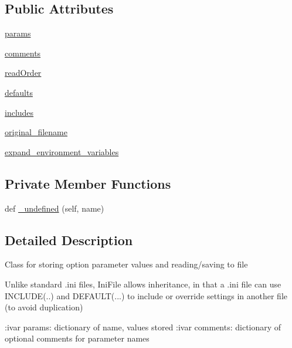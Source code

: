 \subsection*{Public Attributes}
\begin{DoxyCompactItemize}
\item 
\mbox{\hyperlink{classgetdist_1_1inifile_1_1IniFile_ade5c24106562f55d45b3489dfca2b895}{params}}
\item 
\mbox{\hyperlink{classgetdist_1_1inifile_1_1IniFile_add7d9ff2956a1ff74652eefc5e9e1407}{comments}}
\item 
\mbox{\hyperlink{classgetdist_1_1inifile_1_1IniFile_acef36ab183335aff24a0a9d9f7cc7e05}{read\+Order}}
\item 
\mbox{\hyperlink{classgetdist_1_1inifile_1_1IniFile_a53f2a18e3f51bdd7d5f033d8a4d2f195}{defaults}}
\item 
\mbox{\hyperlink{classgetdist_1_1inifile_1_1IniFile_a205506da91715ec582742d49f0678397}{includes}}
\item 
\mbox{\hyperlink{classgetdist_1_1inifile_1_1IniFile_affba271d146b71ffa468086d85d08028}{original\+\_\+filename}}
\item 
\mbox{\hyperlink{classgetdist_1_1inifile_1_1IniFile_ac800cfc0a6643c54893324e69ed3a7f6}{expand\+\_\+environment\+\_\+variables}}
\end{DoxyCompactItemize}
\subsection*{Private Member Functions}
\begin{DoxyCompactItemize}
\item 
def \mbox{\hyperlink{classgetdist_1_1inifile_1_1IniFile_acf53cc236a011dff4c0dc416cd7fdd1c}{\+\_\+undefined}} (self, name)
\end{DoxyCompactItemize}


\subsection{Detailed Description}
\begin{DoxyVerb}Class for storing option parameter values and reading/saving to file

Unlike standard .ini files, IniFile allows inheritance, in that a .ini file can use
INCLUDE(..) and DEFAULT(...) to include or override settings in another file (to avoid duplication)

:ivar params: dictionary of name, values stored
:ivar comments: dictionary of optional comments for parameter names
\end{DoxyVerb}
 

